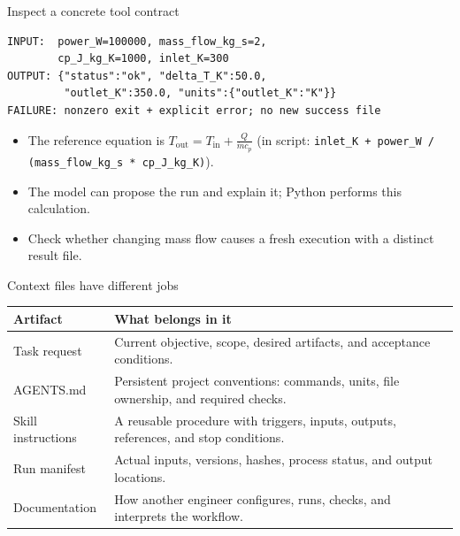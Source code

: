 \documentclass[aspectratio=169,11pt]{beamer}
\begin{document}
\begin{frame}[t,fragile]{Inspect a concrete tool contract}
\begin{lstlisting}
INPUT:  power_W=100000, mass_flow_kg_s=2,
        cp_J_kg_K=1000, inlet_K=300
OUTPUT: {"status":"ok", "delta_T_K":50.0,
         "outlet_K":350.0, "units":{"outlet_K":"K"}}
FAILURE: nonzero exit + explicit error; no new success file
\end{lstlisting}
\fontsize{10.5}{12.5}\selectfont
\begin{itemize}\setlength{\itemsep}{2mm}
\item The reference equation is $T_{\mathrm{out}} = T_{\mathrm{in}} + \frac{Q}{\dot{m} c_p}$ (in script: \texttt{inlet\_K + power\_W / (mass\_flow\_kg\_s * cp\_J\_kg\_K)}).
\item The model can propose the run and explain it; Python performs this calculation.
\item Check whether changing mass flow causes a fresh execution with a distinct result file.
\end{itemize}
\end{frame}
\begin{frame}[t,fragile]{Context files have different jobs}
\fontsize{10.5}{12.5}\selectfont\setlength{\tabcolsep}{4pt}\renewcommand{\arraystretch}{1.15}
\begin{tabular}{>{\raggedright\arraybackslash}p{}>{\raggedright\arraybackslash}p{}}
\toprule
\textbf{Artifact} & \textbf{What belongs in it} \\ \midrule
Task request & Current objective, scope, desired artifacts, and acceptance conditions. \\[2pt]
AGENTS.md & Persistent project conventions: commands, units, file ownership, and required checks. \\[2pt]
Skill instructions & A reusable procedure with triggers, inputs, outputs, references, and stop conditions. \\[2pt]
Run manifest & Actual inputs, versions, hashes, process status, and output locations. \\[2pt]
Documentation & How another engineer configures, runs, checks, and interprets the workflow. \\[2pt]
\bottomrule\end{tabular}\par\vspace{2mm}
\end{frame}
\end{document}

